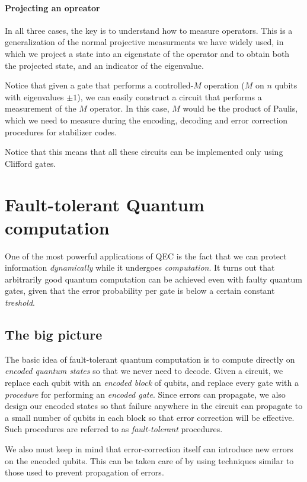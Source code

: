 \documentclass[11pt,a4paper]{article}
\theoremstyle{definition}
\theoremstyle{plain}
\theoremstyle{remark}
\begin{document}
\paragraph{Projecting an opreator}
In all three cases, the  key is to understand how to measure operators. 
This is a generalization of the normal projective measurments we have widely used, 
in which we project a state into an eigenstate of the operator and to obtain both the 
projected state, and an indicator of the eigenvalue. 

Notice that given a gate that performs a controlled-$M$ operation ($M$ on $n$ qubits with eigenvalues $\pm 1$), we can easily 
construct a circuit that performs a measurement of the $M$ operator. In this case, $M$ would be 
the product of Paulis, which we need to measure during the encoding, decoding and error correction procedures for stabilizer codes. 

Notice that this means that all these circuits can be implemented only using Clifford gates. 

\section{Fault-tolerant Quantum computation}
One of the most powerful applications of QEC is the fact that we can protect information 
\emph{dynamically} while it undergoes \emph{computation}. 
It turns out that arbitrarily good quantum computation can be achieved even with faulty quantum gates, given 
that the error probability per gate is below a certain constant \emph{treshold}. 

\subsection{The big picture} 
The basic idea of fault-tolerant quantum computation is to compute directly on \emph{encoded quantum states} 
so that we never need to decode. Given a circuit, we replace each qubit with an \emph{encoded block} of qubits, 
and replace every gate with a \emph{procedure} for performing an \emph{encoded gate}. 
Since errors can propagate, we also design our encoded states so that failure anywhere in the circuit 
can propagate to a small number of qubits in each block so that error correction 
will be effective. Such procedures are referred to as \emph{fault-tolerant} procedures. 

We also must keep in mind that error-correction itself can introduce new errors on the encoded qubits. 
This can be taken care of by using techniques similar to those used to prevent propagation of errors. 
\end{document}
